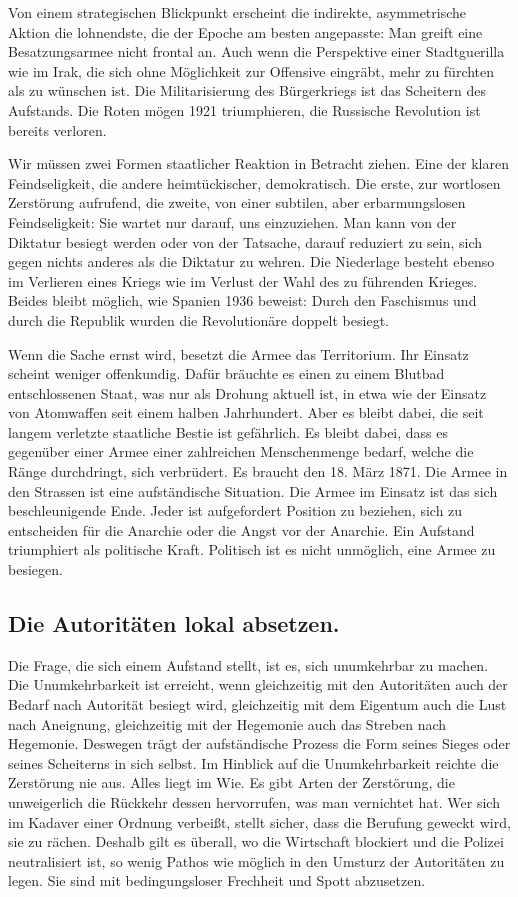 Von einem strategischen Blickpunkt erscheint die indirekte,
asymmetrische Aktion die lohnendste, die der Epoche am besten
angepasste: Man greift eine Besatzungsarmee nicht frontal an. Auch
wenn die Perspektive einer Stadtguerilla wie im Irak, die sich ohne
Möglichkeit zur Offensive eingräbt, mehr zu fürchten als zu
wünschen ist. Die Militarisierung des Bürgerkriegs ist das
Scheitern des Aufstands. Die Roten mögen 1921 triumphieren, die
Russische Revolution ist bereits verloren.

Wir müssen zwei Formen staatlicher Reaktion in Betracht ziehen.
Eine der klaren Feindseligkeit, die andere heimtückischer,
demokratisch. Die erste, zur wortlosen Zerstörung aufrufend, die
zweite, von einer subtilen, aber erbarmungslosen Feindseligkeit:
Sie wartet nur darauf, uns einzuziehen. Man kann von der Diktatur
besiegt werden oder von der Tatsache, darauf reduziert zu sein,
sich gegen nichts anderes als die Diktatur zu wehren. Die
Niederlage besteht ebenso im Verlieren eines Kriegs wie im Verlust
der Wahl des zu führenden Krieges. Beides bleibt möglich, wie
Spanien 1936 beweist: Durch den Faschismus und durch die Republik
wurden die Revolutionäre doppelt besiegt.

Wenn die Sache ernst wird, besetzt die Armee das Territorium. Ihr
Einsatz scheint weniger offenkundig. Dafür bräuchte es einen zu
einem Blutbad entschlossenen Staat, was nur als Drohung aktuell
ist, in etwa wie der Einsatz von Atomwaffen seit einem halben
Jahrhundert. Aber es bleibt dabei, die seit langem verletzte
staatliche Bestie ist gefährlich. Es bleibt dabei, dass es
gegenüber einer Armee einer zahlreichen Menschenmenge bedarf,
welche die Ränge durchdringt, sich verbrüdert. Es braucht den 18.
März 1871. Die Armee in den Strassen ist eine aufständische
Situation. Die Armee im Einsatz ist das sich beschleunigende Ende.
Jeder ist aufgefordert Position zu beziehen, sich zu entscheiden
für die Anarchie oder die Angst vor der Anarchie. Ein Aufstand
triumphiert als politische Kraft. Politisch ist es nicht unmöglich,
eine Armee zu besiegen.

\subsection{Die Autoritäten lokal absetzen.}

Die Frage, die sich einem Aufstand stellt, ist es, sich unumkehrbar
zu machen. Die Unumkehrbarkeit ist erreicht, wenn gleichzeitig mit
den Autoritäten auch der Bedarf nach Autorität besiegt wird,
gleichzeitig mit dem Eigentum auch die Lust nach Aneignung,
gleichzeitig mit der Hegemonie auch das Streben nach Hegemonie.
Deswegen trägt der aufständische Prozess die Form seines Sieges
oder seines Scheiterns in sich selbst. Im Hinblick auf die
Unumkehrbarkeit reichte die Zerstörung nie aus. Alles liegt im Wie.
Es gibt Arten der Zerstörung, die unweigerlich die Rückkehr dessen
hervorrufen, was man vernichtet hat. Wer sich im Kadaver einer
Ordnung verbeißt, stellt sicher, dass die Berufung geweckt wird,
sie zu rächen. Deshalb gilt es überall, wo die Wirtschaft blockiert
und die Polizei neutralisiert ist, so wenig Pathos wie möglich in
den Umsturz der Autoritäten zu legen. Sie sind mit bedingungsloser
Frechheit und Spott abzusetzen.
\extrapar{}


